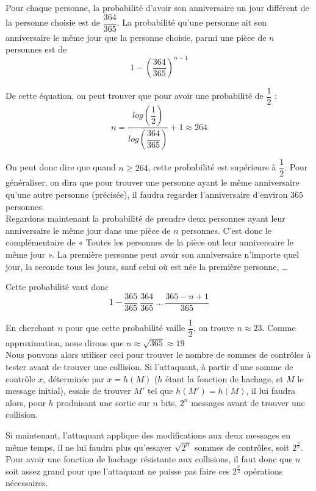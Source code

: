 Pour chaque personne, la probabilité d'avoir son anniversaire un
jour différent de la personne choisie est de $\dfrac{364}{365}$.
La probabilité qu'une personne ait son anniversaire le même jour
que la personne choisie, parmi une pièce de $n$ personnes est de
\[ 1 - \left(\dfrac{364}{365}\right)^{n-1} \]

De cette équation, on peut trouver que pour avoir une probabilité
de $\dfrac{1}{2}$ : 
\[ n =
\dfrac{log\left(\dfrac{1}{2}\right)}{log\left(\dfrac{364}{365}\right)}
+ 1 \approx 264 \]

On peut donc dire que quand $n \geq 264$, cette probabilité est
supérieure à $\dfrac{1}{2}$. Pour généraliser, on dira que pour
trouver une personne ayant le même anniversaire qu'une autre
personne (précisée), il faudra regarder l'anniversaire d'environ
$365$ personnes.
\\

Regardons maintenant la probabilité de prendre deux personnes
ayant leur anniversaire le même jour dans une pièce de $n$
personnes. C'est donc le complémentaire de « Toutes les personnes
de la pièce ont leur anniversaire le même jour ».
La première personne peut avoir son anniversaire n'importe quel
jour, la seconde tous les jours, sauf celui où est née la première
personne, …

Cette probabilité vaut donc
\[1 - \dfrac{365}{365} ~ \dfrac{364}{365} ~ \dots ~ \dfrac{365 - n
+ 1}{365} \]

En cherchant $n$ pour que cette probabilité vaille 
$\dfrac{1}{2}$, on trouve $n \approx 23$. Comme approximation, nous
dirons que $n \approx \sqrt{365} \approx 19$
\\

Nous pouvons alors utiliser ceci pour trouver le nombre
de sommes de contrôles à tester avant de trouver une collision.
Si l'attaquant, à partir d'une somme de contrôle $x$,
déterminée par $x = h(M)$ ($h$ étant la fonction de hachage, et
$M$ le message initial), essaie de trouver $M'$ tel que $h(M') =
h(M)$, il lui faudra alors, pour $h$ produisant une sortie sur $n$
bits, $2^n$ messages avant de trouver une collision.

Si maintenant, l'attaquant applique des modifications aux deux
messages en même temps, il ne lui faudra plus qu'essayer
$\sqrt{2^n}$ sommes de contrôles, soit $2^{\frac{n}{2}}$.
Pour avoir une fonction de hachage résistante aux collisions, il
faut donc que $n$ soit assez grand pour que l'attaquant ne puisse
pas faire ces $2^{\frac{n}{2}}$ opérations nécessaires.

